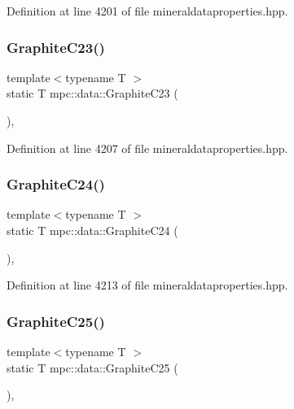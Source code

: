 Definition at line 4201 of file mineraldataproperties.\+hpp.

\mbox{\label{namespacempc_1_1data_ade576db0f4f6bafed6825faa5ac3ea3e}} 
\subsubsection{\texorpdfstring{Graphite\+C23()}{GraphiteC23()}}
{\footnotesize\ttfamily template$<$typename T $>$ \\
static T mpc\+::data\+::\+Graphite\+C23 (\begin{DoxyParamCaption}{ }\end{DoxyParamCaption})\hspace{0.3cm}{\ttfamily [inline]}, {\ttfamily [static]}}



Definition at line 4207 of file mineraldataproperties.\+hpp.

\mbox{\label{namespacempc_1_1data_aadafb2d8d5d027e4605607b5e89ed6ef}} 
\subsubsection{\texorpdfstring{Graphite\+C24()}{GraphiteC24()}}
{\footnotesize\ttfamily template$<$typename T $>$ \\
static T mpc\+::data\+::\+Graphite\+C24 (\begin{DoxyParamCaption}{ }\end{DoxyParamCaption})\hspace{0.3cm}{\ttfamily [inline]}, {\ttfamily [static]}}



Definition at line 4213 of file mineraldataproperties.\+hpp.

\mbox{\label{namespacempc_1_1data_a7664c698301f74e6197b8b0aa6057d74}} 
\subsubsection{\texorpdfstring{Graphite\+C25()}{GraphiteC25()}}
{\footnotesize\ttfamily template$<$typename T $>$ \\
static T mpc\+::data\+::\+Graphite\+C25 (\begin{DoxyParamCaption}{ }\end{DoxyParamCaption})\hspace{0.3cm}{\ttfamily [inline]}, {\ttfamily [static]}}




